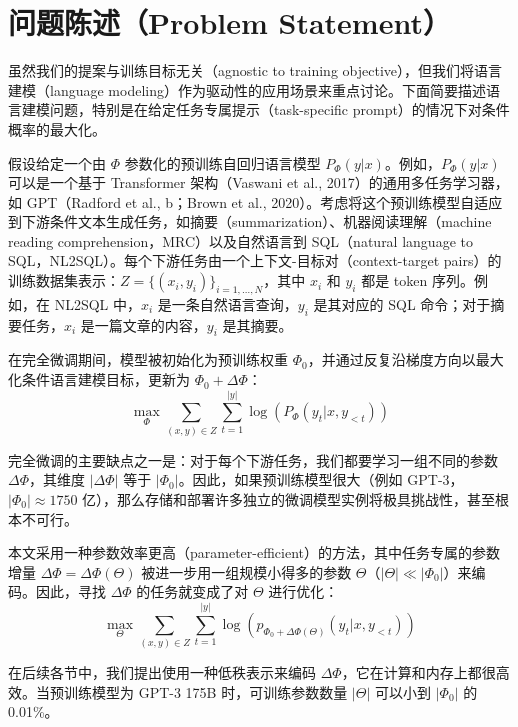 \documentclass[11pt,UTF8,fontset=fandol]{ctexart}
\begin{document}
\section{问题陈述（Problem Statement）}

虽然我们的提案与训练目标无关（agnostic to training objective），但我们将语言建模（language modeling）作为驱动性的应用场景来重点讨论。下面简要描述语言建模问题，特别是在给定任务专属提示（task-specific prompt）的情况下对条件概率的最大化。

假设给定一个由 $\Phi$ 参数化的预训练自回归语言模型 $P_\Phi(y|x)$。例如，$P_\Phi(y|x)$ 可以是一个基于 Transformer 架构（Vaswani et al., 2017）的通用多任务学习器，如 GPT（Radford et al., b；Brown et al., 2020）。考虑将这个预训练模型自适应到下游条件文本生成任务，如摘要（summarization）、机器阅读理解（machine reading comprehension，MRC）以及自然语言到 SQL（natural language to SQL，NL2SQL）。每个下游任务由一个上下文-目标对（context-target pairs）的训练数据集表示：$Z=\{(x_i,y_i)\}_{i=1,\dots,N}$，其中 $x_i$ 和 $y_i$ 都是 token 序列。例如，在 NL2SQL 中，$x_i$ 是一条自然语言查询，$y_i$ 是其对应的 SQL 命令；对于摘要任务，$x_i$ 是一篇文章的内容，$y_i$ 是其摘要。

在完全微调期间，模型被初始化为预训练权重 $\Phi_0$，并通过反复沿梯度方向以最大化条件语言建模目标，更新为 $\Phi_0+\Delta\Phi$：
\begin{equation}
\max_{\Phi}\sum_{(x,y)\in Z}\sum_{t=1}^{|y|}\log\!\left(P_\Phi(y_t|x,y_{<t})\right)\tag{1}
\end{equation}

完全微调的主要缺点之一是：对于每个下游任务，我们都要学习一组不同的参数 $\Delta\Phi$，其维度 $|\Delta\Phi|$ 等于 $|\Phi_0|$。因此，如果预训练模型很大（例如 GPT-3，$|\Phi_0|\approx 1750$ 亿），那么存储和部署许多独立的微调模型实例将极具挑战性，甚至根本不可行。

本文采用一种参数效率更高（parameter-efficient）的方法，其中任务专属的参数增量 $\Delta\Phi=\Delta\Phi(\Theta)$ 被进一步用一组规模小得多的参数 $\Theta$（$|\Theta|\ll|\Phi_0|$）来编码。因此，寻找 $\Delta\Phi$ 的任务就变成了对 $\Theta$ 进行优化：
\begin{equation}
\max_{\Theta}\sum_{(x,y)\in Z}\sum_{t=1}^{|y|}\log\!\left(p_{\Phi_0+\Delta\Phi(\Theta)}(y_t|x,y_{<t})\right)\tag{2}
\end{equation}

在后续各节中，我们提出使用一种低秩表示来编码 $\Delta\Phi$，它在计算和内存上都很高效。当预训练模型为 GPT-3 175B 时，可训练参数数量 $|\Theta|$ 可以小到 $|\Phi_0|$ 的 0.01\%。
\end{document}
